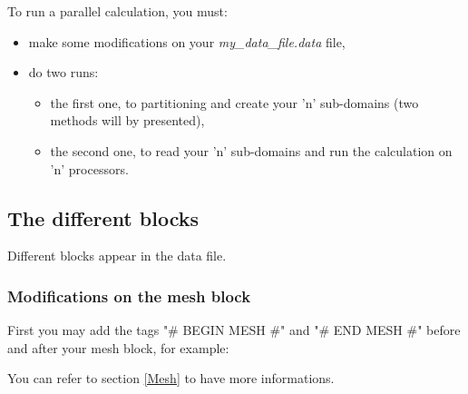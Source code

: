 To run a parallel calculation, you must:
\begin{itemize}
\item make some modifications on your \textit{my\_data\_file.data} file,
\item do two runs:
    \begin{itemize}
    \item the first one, to partitioning and create your 'n' sub-domains (two methods will by presented),
    \item the second one, to read your 'n' sub-domains and run the calculation on 'n' processors.
    \end{itemize}
\end{itemize}



\subsection{The different blocks}
Different blocks appear in the data file.

\subsubsection{Modifications on the mesh block}

First you may add the tags "\# BEGIN MESH \#" and "\# END MESH \#" before and after your mesh block, for example:
\begin{center}
\end{center}
You can refer to section \ref{Mesh} to have more informations.




